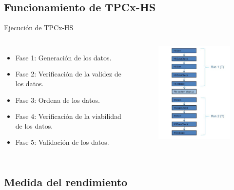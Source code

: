 	\subsection*{Funcionamiento de TPCx-HS}	

		\begin{frame}{Ejecución de TPCx-HS}
				\begin{columns}[c]
					
					\begin{itemize}
						\item Fase 1: Generación de los datos.
						\item Fase 2: Verificación de la validez de los datos.
						\item Fase 3: Ordena de los datos.
						\item Fase 4: Verificación de la viabilidad de los datos.
						\item Fase 5: Validación de los datos.
					\end{itemize}
					
					\begin{figure}[H]
						\centering
						\includegraphics[width=5cm]{./Images/executionsTPC.png}
					\end{figure}

				\end{columns}
	
		\end{frame}
		
	\subsection*{Medida del rendimiento}	
			
